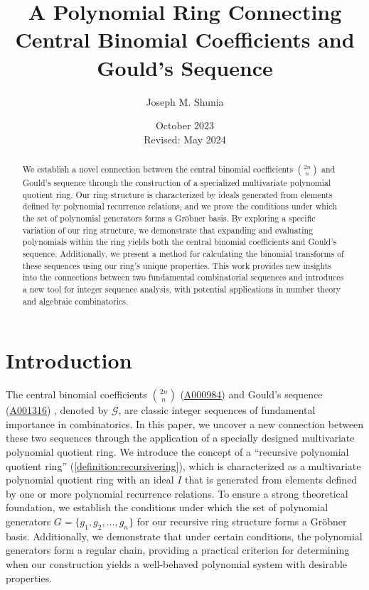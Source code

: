 \documentclass[12pt,reqno]{article}
\theoremstyle{plain}
\newcommand{\Goulds}{\mathcal{G}}
\newcommand{\seqnum}[1]{\href{https://oeis.org/#1}{\rm \underline{#1}}}
\begin{document}
\title{A Polynomial Ring Connecting Central Binomial Coefficients and Gould's Sequence}
\author{Joseph M. Shunia}
\date{October 2023 \\ \small Revised: May 2024 \normalsize}
\maketitle

\begin{abstract}
We establish a novel connection between the central binomial coefficients $\binom{2n}{n}$ and Gould's sequence through the construction of a specialized multivariate polynomial quotient ring. Our ring structure is characterized by ideals generated from elements defined by polynomial recurrence relations, and we prove the conditions under which the set of polynomial generators forms a Gr\"obner basis. By exploring a specific variation of our ring structure, we demonstrate that expanding and evaluating polynomials within the ring yields both the central binomial coefficients and Gould's sequence. Additionally, we present a method for calculating the binomial transforms of these sequences using our ring's unique properties. This work provides new insights into the connections between two fundamental combinatorial sequences and introduces a new tool for integer sequence analysis, with potential applications in number theory and algebraic combinatorics.
\end{abstract}

\section{Introduction}
The central binomial coefficients $\binom{2n}{n}$ (\seqnum{A000984}) \cite{A000984} and Gould's sequence (\seqnum{A001316}) \cite{A001316}, denoted by $\Goulds$, are classic integer sequences of fundamental importance in combinatorics. In this paper, we uncover a new connection between these two sequences through the application of a specially designed multivariate polynomial quotient ring. We introduce the concept of a ``recursive polynomial quotient ring'' (\cref{definition:recursivering}), which is characterized as a multivariate polynomial quotient ring with an ideal $I$ that is generated from elements defined by one or more polynomial recurrence relations. To ensure a strong theoretical foundation, we establish the conditions under which the set of polynomial generators $G = \{ g_1, g_2, \ldots, g_n \}$ for our recursive ring structure forms a Gröbner basis. Additionally, we demonstrate that under certain conditions, the polynomial generators form a regular chain, providing a practical criterion for determining when our construction yields a well-behaved polynomial system with desirable properties.
\end{document}
